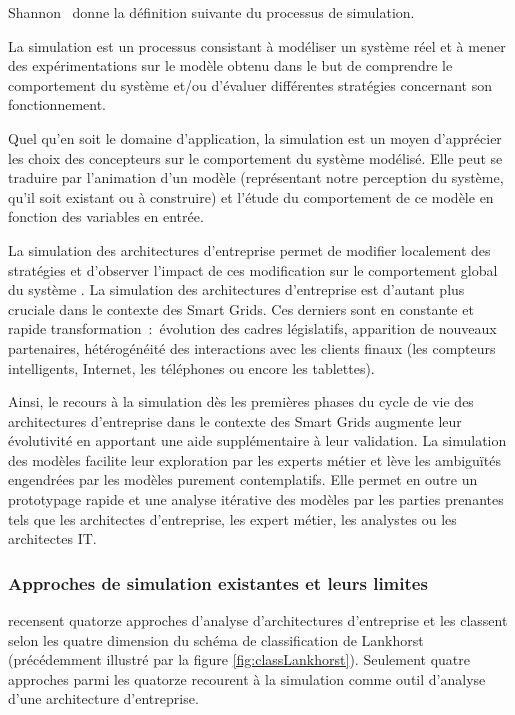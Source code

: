 Shannon~\cite{shannon1975systems} donne la définition suivante du processus de simulation.
\\
\begin{definition}
 La simulation est un processus
consistant à modéliser un système réel et à mener des expérimentations sur le
modèle obtenu dans le but de comprendre le comportement du système et/ou
d'évaluer différentes stratégies concernant son fonctionnement.  
\end{definition}

Quel qu'en
soit le domaine d'application, la simulation est un moyen d'apprécier les choix
des concepteurs sur le comportement du système modélisé. Elle peut se traduire
par l'animation d'un modèle (représentant notre perception du système,
qu'il soit existant ou à construire) et l'étude du comportement de ce modèle en
fonction des variables en entrée. 

La simulation des architectures d'entreprise permet de modifier localement des stratégies
et d'observer l'impact de ces modification sur le comportement global du système \cite{buckl2008towards}. La simulation des architectures d'entreprise est d'autant plus cruciale dans le contexte des Smart Grids. Ces derniers sont en constante et rapide transformation~:~évolution des cadres législatifs, apparition de nouveaux partenaires, hétérogénéité des interactions avec les clients finaux (les compteurs intelligents, Internet, les téléphones ou encore les tablettes). 

Ainsi, le recours à la simulation dès les premières phases du cycle de vie des
architectures d'entreprise dans le contexte des Smart Grids augmente leur évolutivité en apportant une aide supplémentaire à leur validation. La simulation des modèles facilite leur exploration par les experts métier et lève les ambiguïtés engendrées par les
modèles purement contemplatifs. Elle permet en outre un prototypage rapide et
une analyse itérative des modèles par les parties prenantes tels que les
architectes d'entreprise, les expert métier, les analystes ou les architectes
IT. 

\subsubsection{Approches de simulation existantes et leurs limites}
\label{approche_simu_existante}

\cite{manzur2015xarchimate} recensent quatorze approches d'analyse
d'architectures d'entreprise et les classent selon les quatre dimension du
schéma de classification de Lankhorst \cite{lankhorst2013enterprise} (précédemment illustré par la figure
\ref{fig:classLankhorst}). Seulement quatre approches parmi les quatorze
recourent à la simulation comme outil d'analyse d'une architecture
d'entreprise.

